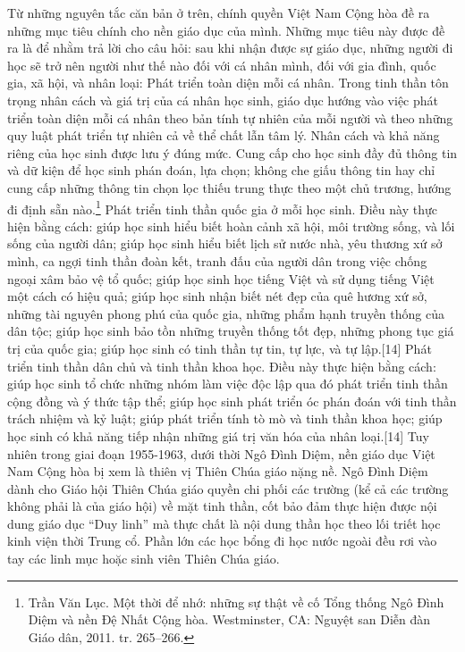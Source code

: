 \documentclass[../thesis.tex]{subfiles}
\begin{document}
Từ những nguyên tắc căn bản ở trên, chính quyền Việt Nam Cộng hòa đề ra những mục tiêu chính cho nền giáo dục của mình. Những mục tiêu này được đề ra là để nhằm trả lời cho câu hỏi: sau khi nhận được sự giáo dục, những người đi học sẽ trở nên người như thế nào đối với cá nhân mình, đối với gia đình, quốc gia, xã hội, và nhân loại:
Phát triển toàn diện mỗi cá nhân. Trong tinh thần tôn trọng nhân cách và giá trị của cá nhân học sinh, giáo dục hướng vào việc phát triển toàn diện mỗi cá nhân theo bản tính tự nhiên của mỗi người và theo những quy luật phát triển tự nhiên cả về thể chất lẫn tâm lý. Nhân cách và khả năng riêng của học sinh được lưu ý đúng mức. Cung cấp cho học sinh đầy đủ thông tin và dữ kiện để học sinh phán đoán, lựa chọn; không che giấu thông tin hay chỉ cung cấp những thông tin chọn lọc thiếu trung thực theo một chủ trương, hướng đi định sẵn nào.\footnote{Trần Văn Lục. Một thời để nhớ: những sự thật về cố Tổng thống Ngô Đình Diệm và nền Đệ Nhất Cộng hòa. Westminster, CA: Nguyệt san Diễn đàn Giáo dân, 2011. tr. 265–266.}
Phát triển tinh thần quốc gia ở mỗi học sinh. Điều này thực hiện bằng cách: giúp học sinh hiểu biết hoàn cảnh xã hội, môi trường sống, và lối sống của người dân; giúp học sinh hiểu biết lịch sử nước nhà, yêu thương xứ sở mình, ca ngợi tinh thần đoàn kết, tranh đấu của người dân trong việc chống ngoại xâm bảo vệ tổ quốc; giúp học sinh học tiếng Việt và sử dụng tiếng Việt một cách có hiệu quả; giúp học sinh nhận biết nét đẹp của quê hương xứ sở, những tài nguyên phong phú của quốc gia, những phẩm hạnh truyền thống của dân tộc; giúp học sinh bảo tồn những truyền thống tốt đẹp, những phong tục giá trị của quốc gia; giúp học sinh có tinh thần tự tin, tự lực, và tự lập.[14]
Phát triển tinh thần dân chủ và tinh thần khoa học. Điều này thực hiện bằng cách: giúp học sinh tổ chức những nhóm làm việc độc lập qua đó phát triển tinh thần cộng đồng và ý thức tập thể; giúp học sinh phát triển óc phán đoán với tinh thần trách nhiệm và kỷ luật; giúp phát triển tính tò mò và tinh thần khoa học; giúp học sinh có khả năng tiếp nhận những giá trị văn hóa của nhân loại.[14]
Tuy nhiên trong giai đoạn 1955-1963, dưới thời Ngô Đình Diệm, nền giáo dục Việt Nam Cộng hòa bị xem là thiên vị Thiên Chúa giáo nặng nề. Ngô Đình Diệm dành cho Giáo hội Thiên Chúa giáo quyền chi phối các trường (kể cả các trường không phải là của giáo hội) về mặt tinh thần, cốt bảo đảm thực hiện được nội dung giáo dục “Duy linh” mà thực chất là nội dung thần học theo lối triết học kinh viện thời Trung cổ. Phần lớn các học bổng đi học nước ngoài đều rơi vào tay các linh mục hoặc sinh viên Thiên Chúa giáo.
\end{document}
